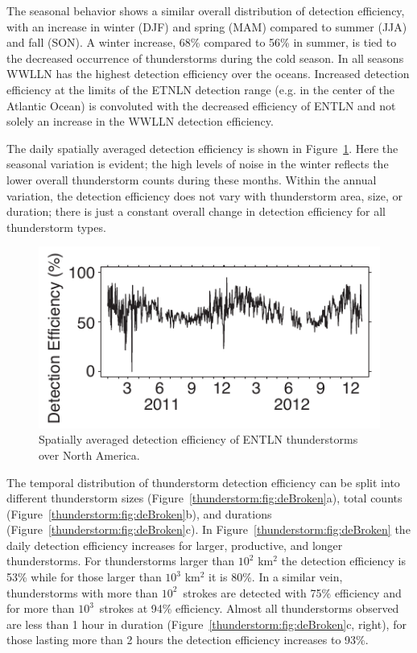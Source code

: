 The seasonal behavior shows a similar overall distribution of detection efficiency, with an increase in winter (DJF) and spring (MAM) compared to summer (JJA) and fall (SON).
A winter increase, 68\% compared to 56\% in summer, is tied to the decreased occurrence of thunderstorms during the cold season.
In all seasons WWLLN has the highest detection efficiency over the oceans.
Increased detection efficiency at the limits of the ETNLN detection range (e.g. in the center of the Atlantic Ocean) is convoluted with the decreased efficiency of ENTLN and not solely an increase in the WWLLN detection efficiency.

The daily spatially averaged detection efficiency is shown in Figure~\ref{thunderstorm:fig:deDaily}.
Here the seasonal variation is  evident; the high levels of noise in the winter reflects the lower overall thunderstorm counts during these months.
Within the annual variation, the detection efficiency does not vary with thunderstorm area, size, or duration; there is just a constant overall change in detection efficiency for all thunderstorm types.

\begin{figure}[ht!]
   \centering
   \includegraphics[scale=1]{thunderstorm/Figures/deDaily.pdf}
   \caption{Spatially averaged detection efficiency of ENTLN thunderstorms over North America.}
   \label{thunderstorm:fig:deDaily}
\end{figure}

The temporal distribution of thunderstorm detection efficiency can be split into different thunderstorm sizes (Figure~\ref{thunderstorm:fig:deBroken}a), total counts (Figure~\ref{thunderstorm:fig:deBroken}b), and durations (Figure~\ref{thunderstorm:fig:deBroken}c).
In Figure~\ref{thunderstorm:fig:deBroken} the daily detection efficiency increases for larger, productive, and longer thunderstorms.
For thunderstorms larger than $10^2$ km$^2$ the detection efficiency is 53\% while for those larger than $10^3$ km$^2$ it is 80\%.
In a similar vein, thunderstorms with more than $10^2$~strokes are detected with 75\% efficiency and for more than $10^3$~strokes at 94\% efficiency.
Almost all thunderstorms observed are less than 1 hour in duration (Figure~\ref{thunderstorm:fig:deBroken}c, right), for those lasting more than 2 hours the detection efficiency increases to 93\%.


